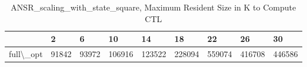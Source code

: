 \begin{table}
\centering
\caption{ANSR\_scaling\_with\_state\_square, Maximum Resident Size in K to Compute CTL}
\label{ANSR_scaling_with_state_square_CTL_size}
\begin{tabular}{lllllllll}
\toprule
{} &      2 &      6 &      10 &      14 &      18 &      22 &      26 &      30 \\
\midrule
full\textbackslash \_opt &  91842 &  93972 &  106916 &  123522 &  228094 &  559074 &  416708 &  446586 \\
\bottomrule
\end{tabular}
\end{table}
